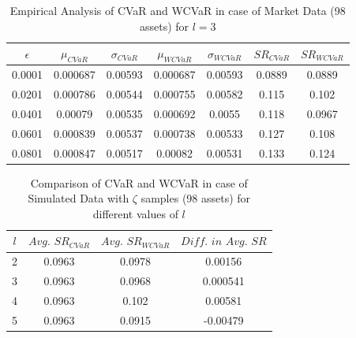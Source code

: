 \documentclass[12pt]{article}
\numberwithin{equation}{section}
\begin{document}
\begin{table}[!h]
    \centering
    \captionsetup{justification=centering}

   \begin{tabular}{||c|c|c|c|c|c|c||}
   \hline
  
$\epsilon$ & $\mu_{CVaR}$ & $\sigma_{CVaR}$ & $\mu_{WCVaR}$ & $\sigma_{WCVaR}$ & $SR_{CVaR}$ & $SR_{WCVaR}$\\
  
  \hline
0.0001 & 0.000687 & 0.00593 & 0.000687 & 0.00593 & 0.0889 & 0.0889 \\
0.0201 & 0.000786 & 0.00544 & 0.000755 & 0.00582 & 0.115 & 0.102 \\
0.0401 & 0.00079 & 0.00535 & 0.000692 & 0.0055 & 0.118 & 0.0967 \\
0.0601 & 0.000839 & 0.00537 & 0.000738 & 0.00533 & 0.127 & 0.108 \\
0.0801 & 0.000847 & 0.00517 & 0.00082 & 0.00531 & 0.133 & 0.124 \\
  \hline
\end{tabular}
    \caption{Empirical Analysis of CVaR and WCVaR in case of Market Data (98 assets) for $l=3$}
    \label{tab:6.4}
\end{table}

\begin{table}[!h]
    \centering
    \captionsetup{justification=centering}

   \begin{tabular}{||c|c|c|c||}
   \hline
  
$l$ & $Avg. \, \, SR_{CVaR}$ & $Avg. \, \, SR_{WCVaR}$ & $Diff. \, \, in \, \, Avg. \, \, SR$ \\
  
  \hline
2 & 0.0963 & 0.0978 & 0.00156 \\
3 & 0.0963 & 0.0968 & 0.000541 \\
4 & 0.0963 & 0.102 & 0.00581 \\
5 & 0.0963 & 0.0915 & -0.00479 \\
  \hline
\end{tabular}
    \caption{Comparison of CVaR and WCVaR in case of Simulated Data with $\zeta$ samples (98 assets) for different values of $l$}
    \label{avgtab:6.5}
\end{table}
\end{document}
